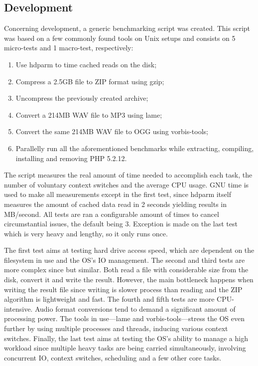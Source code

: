 \subsection{Development}
Concerning development, a generic benchmarking script was created. This script was based on a few commonly found tools on Unix setups and consists on 5 micro-tests and 1 macro-test, respectively:
\begin{enumerate}
  \item Use hdparm to time cached reads on the disk;
  \item Compress a 2.5GB file to ZIP format using gzip;
  \item Uncompress the previously created archive;
  \item Convert a 214MB WAV file to MP3 using lame;
  \item Convert the same 214MB WAV file to OGG using vorbis-tools;
  \item Parallelly run all the aforementioned benchmarks while extracting, compiling, installing and removing PHP 5.2.12.
\end{enumerate}
The script measures the real amount of time needed to accomplish each task, the number of voluntary context switches and the average CPU usage. GNU time is used to make all measurements except in the first test, since hdparm itself measures the amount of cached data read in 2 seconds yielding results in MB/second. All tests are ran a configurable amount of times to cancel circumstantial issues, the default being 3. Exception is made on the last test which is very heavy and lengthy, so it only runs once.

The first test aims at testing hard drive access speed, which are dependent on the filesystem in use and the OS's IO management. The second and third tests are more complex since but similar. Both read a file with considerable size from the disk, convert it and write the result. However, the main bottleneck happens when writing the result file since writing is slower process than reading and the ZIP algorithm is lightweight and fast. The fourth and fifth tests are more CPU-intensive. Audio format conversions tend to demand a significant amount of processing power. The tools in use---lame and vorbis-tools---stress the OS even further by using multiple processes and threads, inducing various context switches. Finally, the last test aims at testing the OS's ability to manage a high workload since multiple heavy tasks are being carried simultaneously, involving concurrent IO, context switches, scheduling and a few other core tasks.

